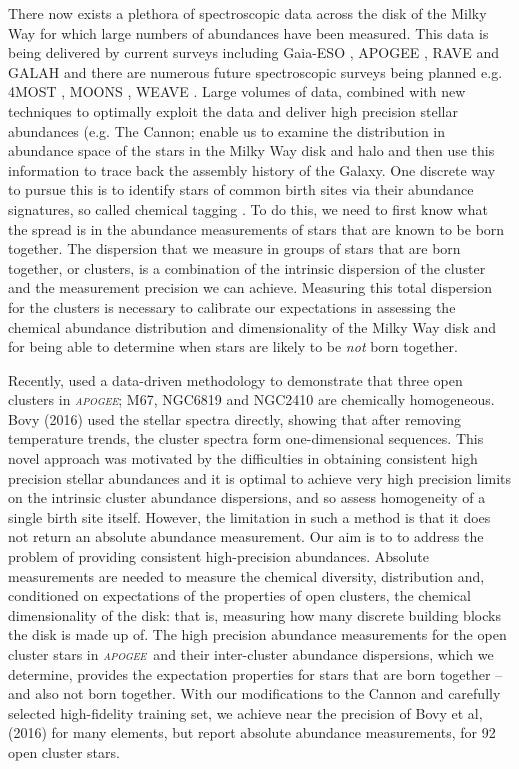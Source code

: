 \documentclass[14pt, preprint2]{aastex6}
\newcommand{\project}[1]{\textsl{#1}}
\newcommand{\apogee}{\project{\textsc{apogee}}}
\begin{document}
There now exists a plethora of spectroscopic data across the disk of the Milky Way for which large numbers of abundances have been measured. This data is being delivered by current surveys including Gaia-ESO \citep{gilmore2012}, APOGEE \citep{Majewski2015}, RAVE \citep{Kunder2016, Casey2016b} and GALAH \citep{Freeman2012, deSilva2015} and there are numerous future spectroscopic surveys being planned e.g. 4MOST \citep{deJong2015}, MOONS \citep{C2012}, WEAVE \citep{D2012}. Large volumes of data, combined with new techniques to optimally exploit the data and deliver high precision stellar abundances (e.g. The Cannon; \citep{Ness2015, Casey2016} enable us to examine the distribution in abundance space of the stars in the Milky Way disk and halo and then use this information to trace back the assembly history of the Galaxy. One discrete way to pursue this is to identify stars of common birth sites via their abundance signatures, so called chemical tagging \citep{freeman2002}. To do this, we need to first know what the spread is in the abundance measurements of stars that are known to be born together.  The dispersion that we measure in groups of stars that are born together, or clusters, is a combination of the intrinsic dispersion of the cluster and the measurement precision we can achieve. Measuring this total dispersion for the clusters is necessary to calibrate our expectations in assessing the chemical abundance distribution and dimensionality of the Milky Way disk and for being able to determine when stars are likely to be \textit{not} born together. 

Recently, \citet{Bovy2016} used a data-driven methodology to demonstrate that three open clusters in \apogee; M67, NGC6819 and NGC2410 are chemically homogeneous. Bovy (2016) used the stellar spectra directly, showing that after removing temperature trends, the cluster spectra form one-dimensional sequences. This novel approach was motivated by the difficulties in obtaining consistent high precision stellar abundances and it is optimal to achieve very high precision limits on the intrinsic cluster abundance dispersions, and so assess homogeneity of a single birth site itself. However, the limitation in such a method is that it does not return an absolute abundance measurement. Our aim is to to address the problem of providing consistent high-precision abundances.  Absolute measurements are needed to measure the chemical diversity, distribution and, conditioned on expectations of the properties of open clusters, the chemical dimensionality of the disk: that is, measuring how many discrete building blocks the disk is made up of.  The high precision abundance measurements for the open cluster stars in \apogee\ and their inter-cluster abundance dispersions, which we determine, provides the expectation properties for stars that are born together -- and also not born together. With our modifications to the Cannon and carefully selected high-fidelity training set, we achieve near the precision of Bovy et al, (2016) for many elements, but report absolute abundance measurements, for 92 open cluster stars. 
\end{document}
